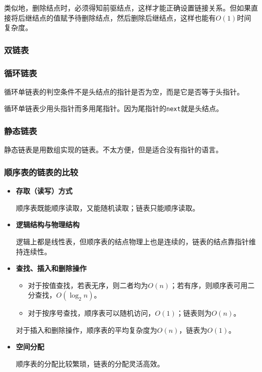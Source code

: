 \documentclass[12pt, a4paper, oneside]{ctexart}
\begin{document}
类似地，删除结点时，必须得知前驱结点，这样才能正确设置链接关系。但如果直接将后继结点的值赋予待删除结点，然后删除后继结点，这样也能有$O(1)$时间复杂度。

\subsubsection{双链表}

\subsubsection{循环链表}

循环单链表的判空条件不是头结点的指针是否为空，而是它是否等于头指针。

循环单链表少用头指针而多用尾指针。因为尾指针的\verb|next|就是头结点。

\subsubsection{静态链表}

静态链表是用数组实现的链表。不太方便，但是适合没有指针的语言。

\subsubsection{顺序表的链表的比较}

\begin{itemize}
  \item {\bf 存取（读写）方式}
  
  顺序表既能顺序读取，又能随机读取；链表只能顺序读取。

  \item {\bf 逻辑结构与物理结构}
  
  逻辑上都是线性表，但顺序表的结点物理上也是连续的，链表的结点靠指针维持连续性。

  \item {\bf 查找、插入和删除操作}
  \begin{itemize}
    \item 对于按值查找，若表无序，则二者均为$O(n)$；若有序，则顺序表可用二分查找，$O(\log_2 n)$。
    \item 对于按序号查找，顺序表可以随机访问，$O(1)$；链表则为$O(n)$。
  \end{itemize}

  对于插入和删除操作，顺序表的平均复杂度为$O(n)$，链表为$O(1)$。

  \item {\bf 空间分配}
  
  顺序表的分配比较繁琐，链表的分配灵活高效。
\end{itemize}
\end{document}
